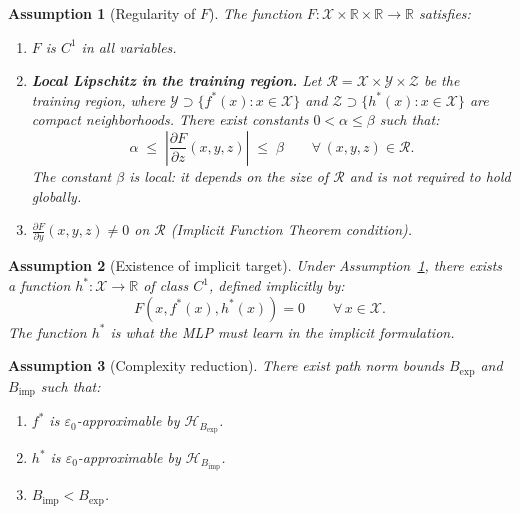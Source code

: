 \documentclass[12pt]{article}
\newtheorem{assumption}{Assumption}
\newcommand{\R}{\mathbb{R}}
\newcommand{\abs}[1]{\left|#1\right|}
\begin{document}
\begin{assumption}[Regularity of $F$]
\label{hip:F}
The function $F: \mathcal{X} \times \R \times \R \to \R$ satisfies:
\begin{enumerate}[label=(\alph*)]
  \item $F$ is $C^1$ in all variables.
  \item \textbf{Local Lipschitz in the training region.}
    Let $\mathcal{R} = \mathcal{X} \times \mathcal{Y} \times
    \mathcal{Z}$ be the training region, where
    $\mathcal{Y} \supset \{f^*(x) : x \in \mathcal{X}\}$ and
    $\mathcal{Z} \supset \{h^*(x) : x \in \mathcal{X}\}$ are compact
    neighborhoods.
    There exist constants $0 < \alpha \le \beta$ such that:
    \begin{equation}
      \alpha \;\le\; \abs{\frac{\partial F}{\partial z}(x,y,z)}
      \;\le\; \beta \qquad \forall\,(x,y,z) \in \mathcal{R}.
      \label{eq:sandwich}
    \end{equation}
    The constant $\beta$ is \emph{local}: it depends on the size of
    $\mathcal{R}$ and is not required to hold globally.
  \item $\frac{\partial F}{\partial y}(x,y,z) \neq 0$ on
    $\mathcal{R}$ (Implicit Function Theorem condition).
\end{enumerate}
\end{assumption}

\begin{assumption}[Existence of implicit target]
\label{hip:h}
Under Assumption~\ref{hip:F}, there exists a function
$h^*: \mathcal{X} \to \R$ of class $C^1$, defined implicitly by:
\begin{equation}
  F(x, f^*(x), h^*(x)) = 0 \qquad \forall\, x \in \mathcal{X}.
\end{equation}
The function $h^*$ is what the MLP must learn in the implicit
formulation.
\end{assumption}

\begin{assumption}[Complexity reduction]
\label{hip:reduccion}
There exist path norm bounds $B_{\mathrm{exp}}$ and $B_{\mathrm{imp}}$
such that:
\begin{enumerate}[label=(\alph*)]
  \item $f^*$ is $\varepsilon_0$-approximable by
    $\mathcal{H}_{B_{\mathrm{exp}}}$.
  \item $h^*$ is $\varepsilon_0$-approximable by
    $\mathcal{H}_{B_{\mathrm{imp}}}$.
  \item $B_{\mathrm{imp}} < B_{\mathrm{exp}}$.
\end{enumerate}
\end{assumption}
\end{document}
